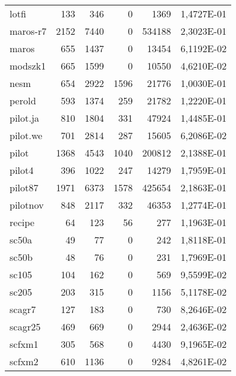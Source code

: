 {\begin{longtable}{>{\ttfamily}lrrrrc}
lotfi        & 133       & 346       & 0           & 1369     & \num{1,4727E-01} \\
maros-r7     & 2152      & 7440      & 0           & 534188   & \num{2,3023E-01} \\
maros        & 655       & 1437      & 0           & 13454    & \num{6,1192E-02} \\
modszk1      & 665       & 1599      & 0           & 10550    & \num{4,6210E-02} \\
nesm         & 654       & 2922      & 1596        & 21776    & \num{1,0030E-01} \\
perold       & 593       & 1374      & 259         & 21782    & \num{1,2220E-01} \\
pilot.ja     & 810       & 1804      & 331         & 47924    & \num{1,4485E-01} \\
pilot.we     & 701       & 2814      & 287         & 15605    & \num{6,2086E-02} \\
pilot        & 1368      & 4543      & 1040        & 200812   & \num{2,1388E-01} \\
pilot4       & 396       & 1022      & 247         & 14279    & \num{1,7959E-01} \\
pilot87      & 1971      & 6373      & 1578        & 425654   & \num{2,1863E-01} \\
pilotnov     & 848       & 2117      & 332         & 46353    & \num{1,2774E-01} \\
recipe       & 64        & 123       & 56          & 277      & \num{1,1963E-01} \\
sc50a        & 49        & 77        & 0           & 242      & \num{1,8118E-01} \\
sc50b        & 48        & 76        & 0           & 231      & \num{1,7969E-01} \\
sc105        & 104       & 162       & 0           & 569      & \num{9,5599E-02} \\
sc205        & 203       & 315       & 0           & 1156     & \num{5,1178E-02} \\
scagr7       & 127       & 183       & 0           & 730      & \num{8,2646E-02} \\
scagr25      & 469       & 669       & 0           & 2944     & \num{2,4636E-02} \\
scfxm1       & 305       & 568       & 0           & 4430     & \num{9,1965E-02} \\
scfxm2       & 610       & 1136      & 0           & 9284     & \num{4,8261E-02} \\

\end{longtable}}
